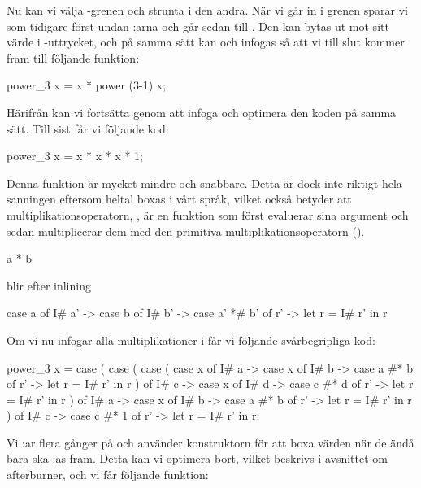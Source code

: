 \documentclass[../Optimise]{subfiles}
\begin{document}
Nu kan vi välja -grenen och strunta i den andra. När vi går in i grenen
sparar vi som tidigare först undan :arna och går sedan till .
Den kan bytas ut mot sitt värde i -uttrycket, och på samma sätt  kan 
och  infogas så att vi till slut kommer fram till följande funktion:

\begin{codeEx}
power_3 x = x * power (3-1) x;
\end{codeEx}

Härifrån kan vi fortsätta genom att infoga  och optimera den
koden på samma sätt. Till sist får vi följande kod:

\begin{codeEx}
power_3 x = x * x * x * 1;
\end{codeEx}

Denna funktion är mycket mindre och snabbare.
Detta är dock inte riktigt hela sanningen eftersom heltal boxas i vårt språk, vilket
också betyder att multiplikationsoperatorn, \ic{*}, är en funktion som först
evaluerar sina argument och sedan multiplicerar dem med den primitiva 
multiplikationsoperatorn (\ic{*\#}).

\begin{codeEx}
a * b
\end{codeEx}

blir efter inlining

\begin{codeEx}
case a of
    { I# a' -> case b of
        { I# b' -> case  a' *# b' of
            { r' -> let r = I# r' in r}}}
\end{codeEx}

Om vi nu infogar alla multiplikationer i  får vi följande svårbegripliga kod:
\begin{codeEx}
power_3 x = case 
    ( case 
        ( case 
            ( case x of
                { I# a -> case x of
                    { I# b -> case a #* b of
                        { r' -> let r = I# r' in r}}}
            ) of
            { I# c -> case x of
                { I# d -> case c #* d of
                    { r' -> let r = I# r' in r}}}                
         ) of
         { I# a -> case x of
              { I# b -> case a #* b of
                   { r' -> let r = I# r' in r}}}
    ) of
        { I# c -> case c #* 1 of
            { r' -> let r = I# r' in r}};                                     
\end{codeEx}


Vi :ar flera gånger på  och använder konstruktorn  för att boxa värden
när de ändå bara ska :as fram.
Detta kan vi optimera bort, vilket beskrivs i avsnittet om afterburner, och vi får följande funktion:
\end{document}
